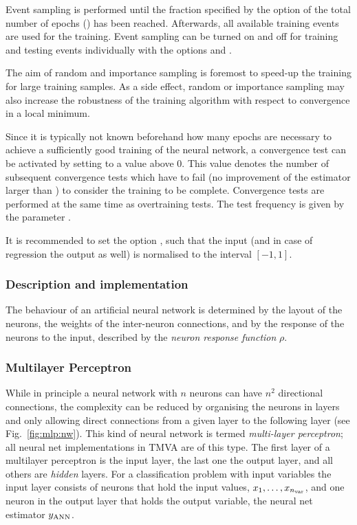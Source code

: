 Event sampling is performed until the fraction specified by the option 
 of the total number of epochs () has been 
reached. Afterwards, all available training events are used for the training. 
Event sampling can be turned on and off for training and testing events 
individually with the options  and .

The aim of random and importance sampling is foremost to speed-up the training 
for large training samples. As a side effect, random or importance sampling may
also increase the robustness of the training algorithm with respect to convergence
in a local minimum.

Since it is typically not known beforehand how many epochs are necessary to 
achieve a sufficiently good training of the neural network, a convergence test 
can be activated by setting  to a value above 0. This 
value denotes the number of subsequent convergence tests which have to fail 
(\ie no improvement of the estimator larger than ) to 
consider the training to be complete. Convergence tests are performed at the 
same time as overtraining tests. The test frequency is given by the parameter 
.

It is recommended to set the option , such that 
the input (and in case of regression the output as well) is normalised to the 
interval $[-1,1]$.

\subsubsection{Description and implementation}
\label{sec:mlp:impl}

The behaviour of an artificial neural network is determined by the layout of
the neurons, the weights of the inter-neuron connections, and by the
response of the neurons to the input, described by the {\em neuron
  response function} $\rho$.

\subsubsection*{Multilayer Perceptron}

While in principle a neural network with $n$ neurons can have $n^2$
directional connections, the complexity can be reduced by organising the
neurons in layers and only allowing direct connections from a given layer 
to the following layer (see Fig.~\ref{fig:mlp:nw}). This kind of
neural network is termed {\em multi-layer perceptron}; all neural net
implementations in TMVA are of this type. The first layer of a multilayer perceptron 
is the input layer, the last one the output layer, and all others are 
{\em hidden} layers.  For a classification problem with \Nvar input
variables the input layer consists of \Nvar
neurons that hold the input values, $x_1,\dots,x_{n_\text{var}}$, and one
neuron in the output layer that holds the output variable, the neural
net estimator $ y_{\rm ANN}$.

